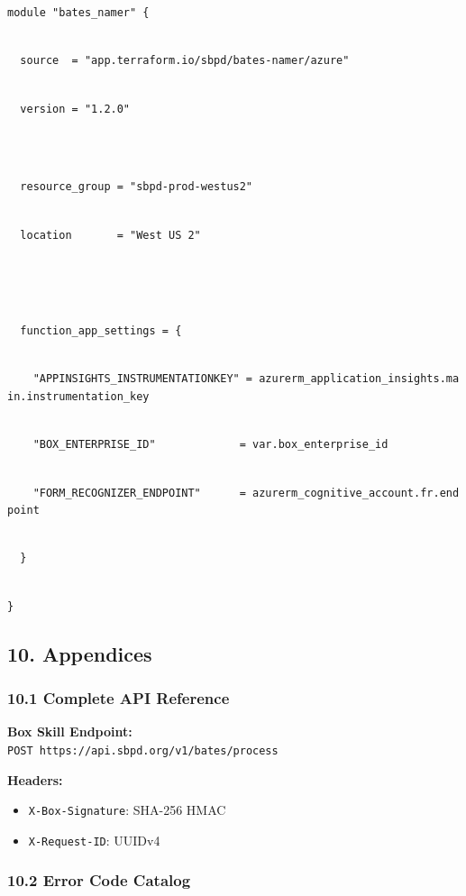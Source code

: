 \documentclass[
]{article}
\providecommand{\tightlist}{%
  \setlength{\itemsep}{0pt}\setlength{\parskip}{0pt}}
\begin{document}
\texttt{module\ "bates\_namer"\ \{}\strut \\
\texttt{\ \ source\ \ =\ "app.terraform.io/sbpd/bates-namer/azure"}\strut \\
\texttt{\ \ version\ =\ "1.2.0"}\strut \\
\strut \\
\texttt{\ \ resource\_group\ =\ "sbpd-prod-westus2"}\strut \\
\texttt{\ \ location\ \ \ \ \ \ \ =\ "West\ US\ 2"}\strut \\
\texttt{\ \ }\strut \\
\texttt{\ \ function\_app\_settings\ =\ \{}\strut \\
\texttt{\ \ \ \ "APPINSIGHTS\_INSTRUMENTATIONKEY"\ =\ azurerm\_application\_insights.main.instrum}\texttt{entation\_key}\strut \\
\texttt{\ \ \ \ "BOX\_ENTERPRISE\_ID"\ \ \ \ \ \ \ \ \ \ \ \ \ =\ var.box\_enterprise\_id}\strut \\
\texttt{\ \ \ \ "FORM\_RECOGNIZER\_ENDPOINT"\ \ \ \ \ \ =\ azurerm\_cognitive\_account.fr.endpoint}\strut \\
\texttt{\ \ \}}\strut \\
\texttt{\}}

\hypertarget{appendices}{%
\subsection{\texorpdfstring{\textbf{10.
Appendices}}{10. Appendices}}\label{appendices}}

\hypertarget{complete-api-reference}{%
\subsubsection{\texorpdfstring{\textbf{10.1 Complete API
Reference}}{10.1 Complete API Reference}}\label{complete-api-reference}}

\textbf{Box Skill Endpoint:}\\
\texttt{POST\ https://api.sbpd.org/v1/bates/p}\texttt{rocess}

\textbf{Headers:}

\begin{itemize}
\tightlist
\item
  \texttt{X-Box-Signature}: SHA-256 HMAC
\item
  \texttt{X-Request-ID}: UUIDv4
\end{itemize}

\hypertarget{error-code-catalog}{%
\subsubsection{\texorpdfstring{\textbf{10.2 Error Code
Catalog}}{10.2 Error Code Catalog}}\label{error-code-catalog}}
\end{document}
